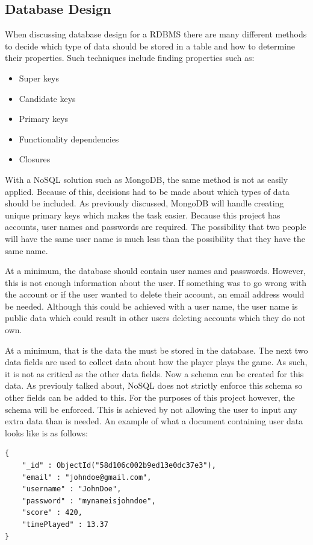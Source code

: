 \documentclass[12pt]{article}
\begin{document}
\subsection{Database Design}
When discussing database design for a RDBMS there are many different methods to decide which type of data should be stored in a table and how to determine their properties. Such techniques include finding properties such as: 

\begin{itemize}
\item Super keys
\item Candidate keys
\item Primary keys
\item Functionality dependencies
\item Closures
\end{itemize}

With a NoSQL solution such as MongoDB, the same method is not as easily applied. Because of this, decisions had to be made about which types of data should be included. As previously discussed, MongoDB will handle creating unique primary keys which makes the task easier. Because this project has accounts, user names and passwords are required. The possibility that two people will have the same user name is much less than the possibility that they have the same name. 

At a minimum, the database should contain user names and passwords. However, this is not enough information about the user. If something was to go wrong with the account or if the user wanted to delete their account, an email address would be needed. Although this could be achieved with a user name, the user name is public data which could result in other users deleting accounts which they do not own. 

At a minimum, that is the data the must be stored in the database. The next two data fields are used to collect data about how the player plays the game. As such, it is not as critical as the other data fields. Now a schema can be created for this data. As previouly talked about, NoSQL does not strictly enforce this schema so other fields can be added to this. For the purposes of this project however, the schema will be enforced. This is achieved by not allowing the user to input any extra data than is needed. An example of what a document containing user data looks like is as follows:

\begin{verbatim}
{
    "_id" : ObjectId("58d106c002b9ed13e0dc37e3"),
    "email" : "johndoe@gmail.com",
    "username" : "JohnDoe",
    "password" : "mynameisjohndoe",
    "score" : 420,
    "timePlayed" : 13.37
}
\end{verbatim} 
\end{document}
